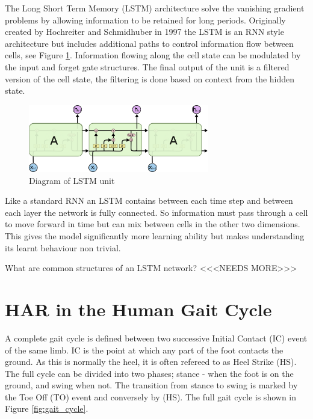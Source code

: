The Long Short Term Memory (LSTM) architecture solve the vanishing gradient problems by allowing information to be retained for long periods. Originally created by Hochreiter and Schmidhuber in 1997\cite{Hochreiter1997} the LSTM is an RNN style architecture but includes additional paths to control information flow between cells, see Figure \ref{fig:lstm_unit}. Information flowing along the cell state can be modulated by the input and forget gate structures. The final output of the unit is a filtered version of the cell state, the filtering is done based on context from the hidden state.\cite{Olah2015}   %
\begin{figure}[!htb]
    \centering
    \includegraphics[width=0.7\textwidth]{Figures/lstm/LSTM-chain.png}
    \caption{Diagram of LSTM unit \cite{Olah2015}}
    \label{fig:lstm_unit}
\end{figure}

Like a standard RNN an LSTM contains between each time step and between each layer the network is fully connected. So information must pass through a cell to move forward in time but can mix between cells in the other two dimensions. This gives the model significantly more learning ability but makes understanding its learnt behaviour non trivial.

What are common structures of an LSTM network? <<<NEEDS MORE>>>

\section{HAR in the Human Gait Cycle}
A complete gait cycle is defined between two successive Initial Contact (IC) event of the same limb. IC is the point at which any part of the foot contacts the ground. As this is normally the heel, it is often refereed to as Heel Strike (HS). The full cycle can be divided into two phases; stance - when the foot is on the ground, and swing when not. The transition from stance to swing is marked by the Toe Off (TO) event and conversely by (HS). The full gait cycle is shown in Figure \ref{fig:gait_cycle}.

